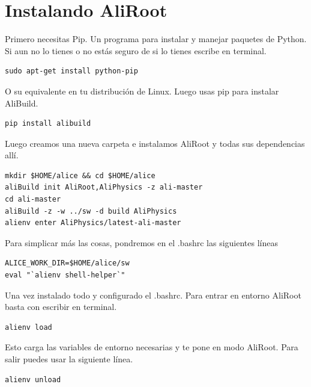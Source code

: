 \documentclass{article}
\begin{document}
\section{Instalando AliRoot}

Primero necesitas Pip. Un programa para instalar y manejar paquetes de Python. Si aun no lo tienes o no est\'as seguro de si lo tienes escribe en terminal.

\begin{tcolorbox}[breakable]
\begin{verbatim}
sudo apt-get install python-pip
\end{verbatim}
\end{tcolorbox}
O su equivalente en tu distribuci\'on de Linux. Luego usas pip para instalar AliBuild.
\begin{tcolorbox}[breakable]
\begin{verbatim}
pip install alibuild
\end{verbatim}
\end{tcolorbox}
Luego creamos una nueva carpeta e instalamos AliRoot y todas sus dependencias all\'i.
\begin{tcolorbox}[breakable]
\begin{verbatim}
mkdir $HOME/alice && cd $HOME/alice
aliBuild init AliRoot,AliPhysics -z ali-master
cd ali-master
aliBuild -z -w ../sw -d build AliPhysics
alienv enter AliPhysics/latest-ali-master
\end{verbatim}
\end{tcolorbox}

Para simplicar m\'as las cosas, pondremos en el .bashrc las siguientes l\'ineas
\begin{tcolorbox}[breakable]
\begin{verbatim}
ALICE_WORK_DIR=$HOME/alice/sw
eval "`alienv shell-helper`"
\end{verbatim}
\end{tcolorbox}

Una vez instalado todo y configurado el .bashrc. Para entrar en entorno AliRoot basta con escribir en terminal.
\begin{tcolorbox}[breakable]
\begin{verbatim}
alienv load
\end{verbatim}
\end{tcolorbox}
Esto carga las variables de entorno necesarias y te pone en modo AliRoot. Para salir puedes usar la siguiente l\'inea.
\begin{tcolorbox}[breakable]
\begin{verbatim}
alienv unload
\end{verbatim}
\end{tcolorbox}
\end{document}
